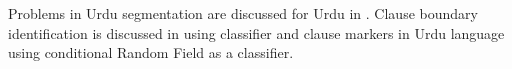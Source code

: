 

Problems in Urdu segmentation are discussed for Urdu in \cite{durrani2010urdu}. Clause boundary identification is discussed in 
\cite{parveen2011clause} using classifier
and clause markers in Urdu language using conditional Random Field as a classifier.





